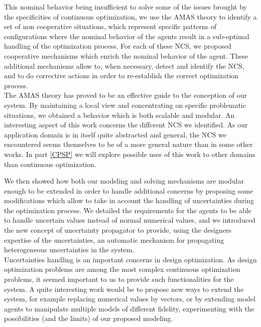 This nominal behavior being insufficient to solve some of the issues brought by the specificities of continuous optimization, we use the AMAS theory to identify a set of non cooperative situations, which represent specific patterns of configurations where the nominal behavior of the agents result in a sub-optimal handling of the optimization process. For each of these NCS, we proposed cooperative mechanisms which enrich the nominal behavior of the agent. These additional mechanisms allow to, when necessary, detect and identify the NCS, and to do corrective actions in order to re-establish the correct optimization process.
\\
The AMAS theory has proved to be an effective guide to the conception of our system. By maintaining a local view and concentrating on specific problematic situations, we obtained a behavior which is both scalable and modular. An interesting aspect of this work concerns the different NCS we identified. As our application domain is in itself quite abstracted and general, the NCS we encountered seems themselves to be of a more general nature than in some other works. In part \ref{CPSP} we will explore possible uses of this work to other domains than continuous optimization.

We then showed how both our modeling and solving mechanisms are modular enough to be extended in order to handle additional concerns by proposing some modifications which allow to take in account the handling of uncertainties during the optimization process. We detailed the requirements for the agents to be able to handle uncertain values instead of normal numerical values, and we introduced the new concept of uncertainty propagator to provide, using the designers expertise of the uncertainties, an automatic mechanism for propagating heterogeneous uncertainties in the system.
\\
Uncertainties handling is an important concerns in design optimization. As design optimization problems are among the most complex continuous optimization problems, it seemed important to us to provide such functionalities for the system. A quite interesting work would be to propose new ways to extend the system, for example replacing numerical values by vectors, or by extending model agents to manipulate multiple models of different fidelity, experimenting with the possibilities (and the limits) of our proposed modeling.
